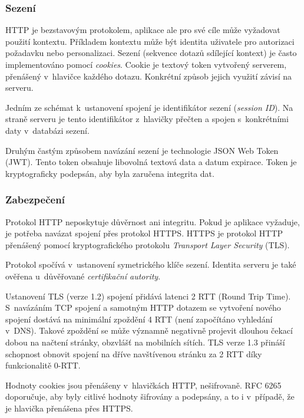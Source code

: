\subsubsection{Sezení}

HTTP je bezstavovým protokolem, aplikace ale pro své cíle může vyžadovat použití kontextu.
Příkladem kontextu může být identita uživatele pro autorizaci požadavku nebo personalizaci.
Sezení (sekvence dotazů sdílející kontext) je často implementováno pomocí \emph{cookies}.
Cookie je textový token vytvořený serverem, přenášený v~hlavičce každého dotazu.
Konkrétní způsob jejich využití závisí na serveru.
\cite{cookies}

Jedním ze schémat k~ustanovení spojení je identifikátor sezení (\emph{session ID}).
Na straně serveru je tento identifikátor z~hlavičky přečten a spojen s~konkrétními daty v~databázi sezení.

Druhým častým způsobem navázání sezení je technologie JSON Web Token (JWT).
Tento token obsahuje libovolná textová data a datum expirace.
Token je kryptograficky podepsán, aby byla zaručena integrita dat.

\subsubsection{Zabezpečení}

Protokol HTTP neposkytuje důvěrnost ani integritu.
Pokud je aplikace vyžaduje, je potřeba navázat spojení přes protokol HTTPS.
HTTPS je protokol HTTP přenášený pomocí kryptografického protokolu \emph{Transport Layer Security} (TLS).

Protokol spočívá v~ustanovení symetrického klíče sezení.
Identita serveru je také ověřena u~důvěřované \emph{certifikační autority}.

Ustanovení TLS (verze 1.2) spojení přidává latenci 2 RTT (Round Trip Time).
S~navázáním TCP spojení a samotným HTTP dotazem se vytvoření nového spojení dostává na minimální zpoždění 4 RTT (není započítáno vyhledání v~DNS).
Takové zpoždění se může významně negativně projevit dlouhou čekací dobou na načtení stránky, obzvlášť na mobilních sítích.
TLS verze 1.3 přináší schopnost obnovit spojení na dříve navštívenou stránku za 2 RTT díky funkcionalitě 0-RTT. \cite{tls}


Hodnoty cookies jsou přenášeny v~hlavičkách HTTP, nešifrovaně.
RFC 6265 \cite{cookies} doporučuje, aby byly citlivé hodnoty šifrovány a podepsány, a to i v~případě, že je hlavička přenášena přes HTTPS.

